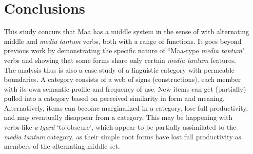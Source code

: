 \documentclass[output=paper,colorlinks,citecolor=brown
]{langscibook}
\begin{document}
\section{Conclusions}\label{sec:Payne:Conclusions}

This study concurs that Maa has a middle system in the sense of \citet{Inglese2022a} with alternating middle and \textit{media tantum} verbs, both with a range of functions. It goes beyond previous work by demonstrating the specific nature of ``Maa-type \textit{media tantum}" verbs and showing that some forms share only certain \textit{media tantum} features. The analysis thus is also a case study of a  linguistic category with permeable boundaries. A category consists of a web of signs (constructions), each member with its own semantic profile and frequency of use. New items can get (partially) pulled into a category based on perceived similarity in form and meaning. Alternatively, items can become marginalized in a category, lose full productivity, and may eventually disappear from a category. This may be happening with verbs like \textit{a-ɪgará} `to obscure', which appear to be partially assimilated to the \textit{media tantum} category, as their simple root forms have lost full productivity as members of the alternating middle set.
\end{document}
